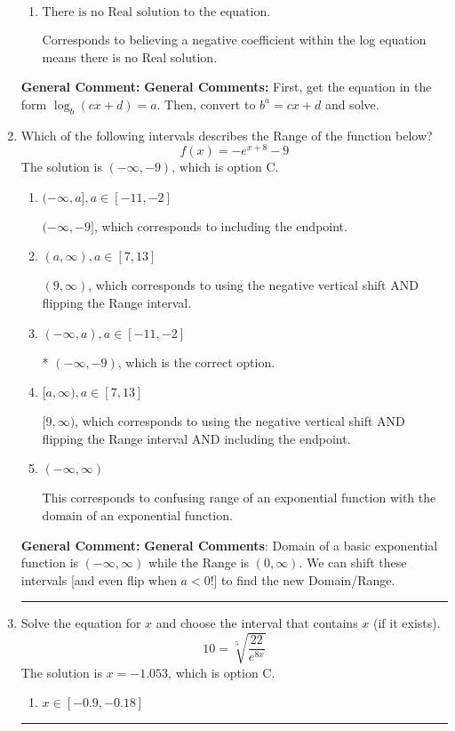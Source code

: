 \documentclass{extbook}[14pt]
\newcommand{\litem}[1]{\item #1

\rule{\textwidth}{0.4pt}}
\begin{document}
\begin{enumerate}
{\begin{enumerate}[label=\Alph*.]
$x = 131.500$, which corresponds to reversing the base and exponent when converting and reversing the value with $x$.
\item \( \text{There is no Real solution to the equation.} \)

Corresponds to believing a negative coefficient within the log equation means there is no Real solution.
\end{enumerate}

\textbf{General Comment:} \textbf{General Comments:} First, get the equation in the form $\log_b{(cx+d)} = a$. Then, convert to $b^a = cx+d$ and solve.
}
\litem{
Which of the following intervals describes the Range of the function below?
\[ f(x) = -e^{x+8}-9 \]The solution is \( (-\infty, -9) \), which is option C.\begin{enumerate}[label=\Alph*.]
\item \( (-\infty, a], a \in [-11, -2] \)

$(-\infty, -9]$, which corresponds to including the endpoint.
\item \( (a, \infty), a \in [7, 13] \)

$(9, \infty)$, which corresponds to using the negative vertical shift AND flipping the Range interval.
\item \( (-\infty, a), a \in [-11, -2] \)

* $(-\infty, -9)$, which is the correct option.
\item \( [a, \infty), a \in [7, 13] \)

$[9, \infty)$, which corresponds to using the negative vertical shift AND flipping the Range interval AND including the endpoint.
\item \( (-\infty, \infty) \)

This corresponds to confusing range of an exponential function with the domain of an exponential function.
\end{enumerate}

\textbf{General Comment:} \textbf{General Comments}: Domain of a basic exponential function is $(-\infty, \infty)$ while the Range is $(0, \infty)$. We can shift these intervals [and even flip when $a<0$!] to find the new Domain/Range.
}
\litem{
 Solve the equation for $x$ and choose the interval that contains $x$ (if it exists).
\[  10 = \sqrt[5]{\frac{22}{e^{8x}}} \]The solution is \( x = -1.053 \), which is option C.\begin{enumerate}[label=\Alph*.]
\item \( x \in [-0.9, -0.18] \)


\end{enumerate}}
\end{enumerate}
\end{document}
